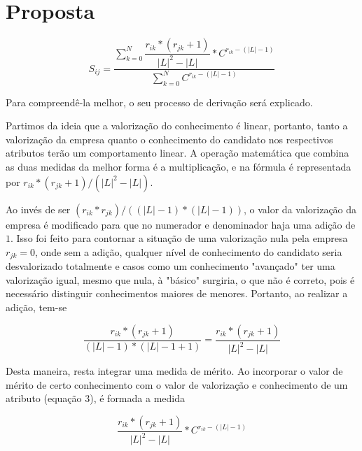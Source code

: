 \documentclass[]{article}
\begin{document}
	\section{Proposta}
	
	\begin{center}
		\begin{equation}
			S_{ij} = \dfrac{\sum_{k = 0}^N \dfrac{r_{ik}*(r_{jk} + 1)}{|L|^2 - |L|} * C^{r_{ik} - (|L| - 1)}}{\sum_{k = 0}^N C^{r_{ik} - (|L| - 1)}}
		\end{equation}	
	\end{center}
	
	Para compreendê-la melhor, o seu processo de derivação será explicado.
	
	Partimos da ideia que a valorização do conhecimento é linear, portanto, tanto a valorização da empresa quanto o conhecimento do candidato nos respectivos atributos terão um comportamento linear. A operação matemática que combina as duas medidas da melhor forma é a multiplicação, e na fórmula é representada por $ r_{ik}*(r_{jk} + 1)/ (|L|^2 - |L|) $. 
	
	Ao invés de ser $ (r_{ik}*r_{jk})/((|L| - 1)*(|L| - 1)) $, o valor da valorização da empresa é modificado para que no numerador e denominador haja uma adição de $1$. Isso foi feito para contornar a situação de uma valorização nula pela empresa $r_{jk} = 0$, onde sem a adição, qualquer nível de conhecimento do candidato seria desvalorizado totalmente e casos como um conhecimento "avançado" ter uma valorização igual, mesmo que nula, à "básico" surgiria, o que não é correto, pois é necessário distinguir conhecimentos maiores de menores. Portanto, ao realizar a adição, tem-se
	
	\begin{center}
		\begin{equation}
			\dfrac{r_{ik}*(r_{jk} + 1)}{(|L| - 1)*(|L| - 1 + 1)} = \dfrac{r_{ik}*(r_{jk} + 1)}{|L|^2 - |L|}
		\end{equation}	
	\end{center}
	
	Desta maneira, resta integrar uma medida de mérito. Ao incorporar o valor de mérito de certo conhecimento com o valor de valorização e conhecimento de um atributo (equação 3), é formada a medida
	
	
	\begin{center}
		\begin{equation}
			\dfrac{r_{ik}*(r_{jk} + 1)}{|L|^2 - |L|} * C^{r_{ik} - (|L| - 1)}
		\end{equation}
	\end{center}
	
\end{document}
